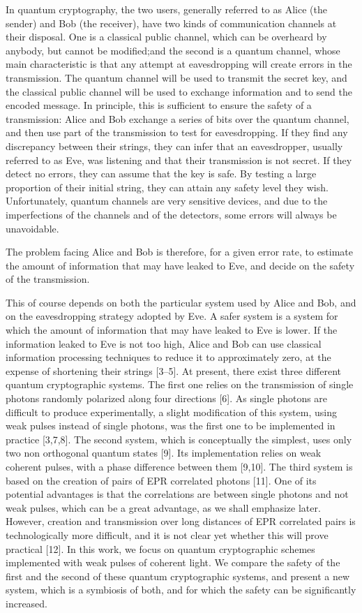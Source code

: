In quantum cryptography, the two users, generally referred to as Alice (the sender) and Bob (the receiver), have two kinds of communication channels at their disposal. One is a classical public channel, which can be overheard by anybody, but cannot be modified;and the second is a quantum channel, whose main characteristic is that any attempt at eavesdropping will create errors in the transmission. The quantum channel will be used to transmit the secret key, and the classical public channel will be used to exchange information and to send the encoded message. In principle, this is sufficient to ensure the safety of a transmission: Alice and Bob exchange a series of bits over the quantum channel, and then use part of the transmission to test for eavesdropping. If they find any discrepancy between their strings, they can infer that an eavesdropper, usually referred to as Eve, was listening and that their transmission is not secret. If they detect no errors, they can assume that the key is safe. By testing a large proportion of their initial string, they can attain any safety level they wish. Unfortunately, quantum channels are very sensitive devices, and due to the imperfections of the channels and of the detectors, some errors will always be unavoidable.

The problem facing Alice and Bob is therefore, for a given error rate, to estimate the amount of information that may have leaked to Eve, and decide on the safety of the transmission.

This of course depends on both the particular system used by Alice and Bob, and on the eavesdropping strategy adopted by Eve. A safer system is a system for which the amount of information that may have leaked to Eve is lower. If the information leaked to Eve is not too high, Alice and Bob can use classical information processing techniques to reduce it to approximately zero, at the expense of shortening their strings [3–5].
At present, there exist three different quantum cryptographic systems. The first one relies on the transmission of single photons randomly polarized along four directions [6].
As single photons are difficult to produce experimentally, a slight modification of this system, using weak pulses instead of single photons, was the first one to be implemented in practice [3,7,8]. The second system, which is conceptually the simplest, uses only two non orthogonal quantum states [9]. Its implementation relies on weak coherent pulses, with a phase difference between them [9,10]. The third system is based on the creation of pairs of EPR correlated photons [11]. One of its potential advantages is that the correlations are between single photons and not weak pulses, which can be a great advantage, as we shall emphasize later. However, creation and transmission over long distances of EPR correlated pairs is technologically more difficult, and it is not clear yet whether this will prove practical [12]. In this work, we focus on quantum cryptographic schemes implemented with weak pulses of coherent light. We compare the safety of the first and the second of these quantum cryptographic systems, and present a new system, which is a symbiosis of both, and for which the safety can be significantly increased.

